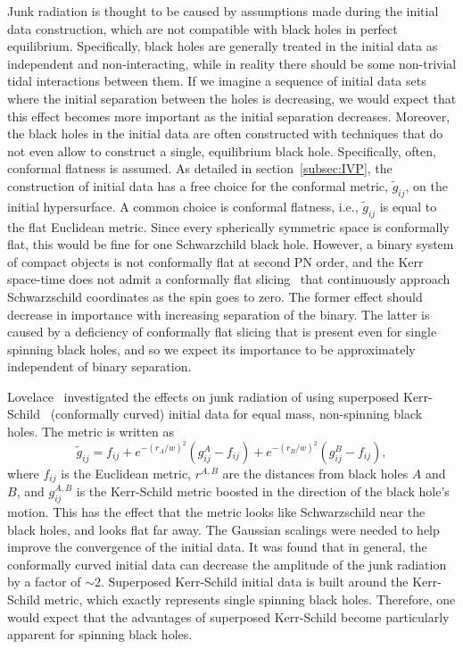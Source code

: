 Junk radiation is thought to be caused by assumptions made during the
initial data construction, which are not compatible with black holes in perfect equilibrium. Specifically,
 black holes are generally treated in the
initial data as independent and non-interacting, while in reality
there should be some non-trivial tidal interactions between them. If
we imagine a sequence of initial data sets where the initial
separation between the holes is decreasing, we would expect that this
effect becomes more important as the initial separation decreases. 
Moreover, the black holes in the initial data are often constructed
with techniques that do not even allow to construct a single, equilibrium black  hole.  Specifically, often, conformal flatness is assumed. As detailed in section~\ref{subsec:IVP}, the construction of initial data has a
free choice for the conformal metric, $\tilde{g}_{ij}$, on the initial
hypersurface. A common choice is conformal flatness, i.e.,
$\tilde{g}_{ij}$ is equal to the flat Euclidean metric. Since every
spherically symmetric space is conformally flat, this would be fine
for one Schwarzchild black hole. However,  a
binary system of compact objects is not conformally flat at second PN
order\cite{Rieth:1997}, and the Kerr space-time does not admit a
conformally flat slicing~\cite{GaratPrice:2000} that continuously approach Schwarzschild coordinates as the spin goes to zero. 
The former effect should decrease in importance with increasing separation of the binary.  The latter is caused by a deficiency of conformally flat slicing that is present even for single spinning black holes, and so we expect its importance
to be approximately independent of binary separation.

Lovelace~\cite{Lovelace2009} investigated the effects on junk radiation of using
superposed Kerr-Schild~\cite{Matzner1999,Marronetti-Matzner:2000,Pfeiffer2002a,Lovelace2008} (conformally curved) initial data for equal mass, non-spinning black
holes.  The metric is written as
\begin{equation}
\tilde{g}_{ij}=f_{ij}+e^{-(r_A/w)^2}\left(g_{ij}^A-f_{ij}\right)+e^{-(r_B/w)^2}\left(g_{ij}^B-f_{ij}\right),
\end{equation}
where $f_{ij}$ is the Euclidean metric, $r^{A,B}$ are the distances
from black holes $A$ and $B$, and $g_{ij}^{A,B}$ is the Kerr-Schild metric boosted in
the direction of the black hole's motion. This has the effect that the
metric looks like Schwarzschild near the black holes, and looks flat
far away. The Gaussian scalings were needed to help improve the
convergence of the initial data. It was found that in general, the
conformally curved initial data can decrease the amplitude of the junk
radiation by a factor of $\sim 2$.
Superposed Kerr-Schild initial data is built around the
  Kerr-Schild metric, which exactly represents single spinning black holes.
 Therefore, one would expect that the advantages of superposed Kerr-Schild become particularly apparent for spinning black holes.

